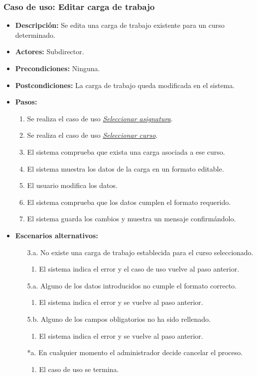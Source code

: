 \documentclass{book}
\begin{document}
\subsubsection*{Caso de uso: Editar carga de trabajo}
\begin{itemize}
\item{\bf Descripción:} Se edita una carga de trabajo existente para un curso determinado.
\item{\bf Actores:} Subdirector.
\item{\bf Precondiciones:} Ninguna.
\item{\bf Postcondiciones:} La carga de trabajo queda modificada en el sistema.
\item{\bf Pasos:}
	\begin{enumerate}
	\item Se realiza el caso de uso {\em \hyperref[select_asignatura]{Seleccionar asignatura}}.
	\item Se realiza el caso de uso {\em \hyperref[select_curso]{Seleccionar curso}}.
	\item El sistema comprueba que exista una carga asociada a ese curso.
	\item El sistema muestra los datos de la carga en un formato editable.
	\item El usuario modifica los datos.
	\item El sistema comprueba que los datos cumplen el formato requerido.
	\item El sistema guarda los cambios y muestra un mensaje confirmándolo.
	\end{enumerate}
\item{\bf Escenarios alternativos:}
	\begin{itemize}
	\item[3.a.] No existe una carga de trabajo establecida para el curso seleccionado.
		\begin{enumerate}
		\item El sistema indica el error y el caso de uso vuelve al paso anterior.
		\end{enumerate}
	\item[5.a.] Alguno de los datos introducidos no cumple el formato correcto.
		\begin{enumerate}
		\item El sistema indica el error y se vuelve al paso anterior.
		\end{enumerate}
	\item[5.b.] Alguno de los campos obligatorios no ha sido rellenado.
		\begin{enumerate}
		\item El sistema indica el error y se vuelve al paso anterior.
		\end{enumerate}	
	\item[*a.] En cualquier momento el administrador decide cancelar el proceso.
		\begin{enumerate}
		\item El caso de uso se termina.
		\end{enumerate}
	\end{itemize}
\end{itemize}
\end{document}
